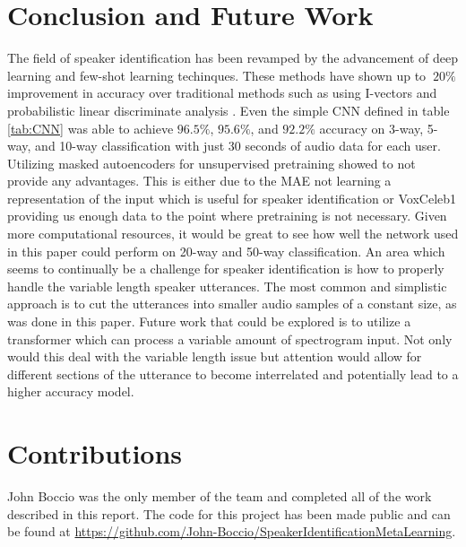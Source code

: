 \documentclass{article}
\begin{document}
\section{Conclusion and Future Work}
The field of speaker identification has been revamped by the advancement of deep learning and few-shot learning techinques.
These methods have shown up to $~20\%$ improvement in accuracy over traditional methods such as using I-vectors and probabilistic 
linear discriminate analysis \cite{ivectorPLDA}. Even the simple CNN defined in table \ref{tab:CNN} was able to achieve
$96.5\%$, $95.6\%$, and $92.2\%$ accuracy on 3-way, 5-way, and 10-way classification with just 30 seconds of audio data
for each user. Utilizing masked autoencoders for unsupervised pretraining showed to not provide any advantages. This is either
due to the MAE not learning a representation of the input which is useful for speaker identification or VoxCeleb1 providing us
enough data to the point where pretraining is not necessary. Given more computational resources, it would be great to see 
how well the network used in this paper could perform on 20-way and 50-way classification. An area which seems to continually
be a challenge for speaker identification is how to properly handle the variable length speaker utterances. The most common
and simplistic approach is to cut the utterances into smaller audio samples of a constant size, as was done in this paper.
Future work that could be explored is to utilize a transformer which can process a variable amount of spectrogram input.
Not only would this deal with the variable length issue but attention would allow for different sections of the utterance
to become interrelated and potentially lead to a higher accuracy model.

\section{Contributions}
John Boccio was the only member of the team and completed all of the work described in this report. The code for this 
project has been made public and can be found at 
\href{https://github.com/John-Boccio/SpeakerIdentificationMetaLearning}{https://github.com/John-Boccio/SpeakerIdentificationMetaLearning}.
\end{document}
